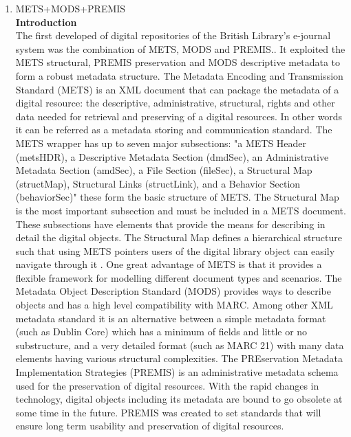 \begin{enumerate}
	\item METS+MODS+PREMIS\\
	{\bf Introduction}\\
	The first developed of digital repositories of the British Library's e-journal system was the combination of METS, MODS and PREMIS..\cite{Dappert2008} 
	It exploited the METS structural, PREMIS preservation and MODS descriptive metadata to form a robust metadata structure. 
	The Metadata Encoding and Transmission Standard (METS) is an XML document that can package the metadata of a digital resource: 
	the descriptive, administrative, structural, rights and other data needed for retrieval and preserving of a digital resources.\cite{Guenther2003} 
	In other words it can be referred as a metadata storing and communication standard. The METS wrapper has up to seven major subsections: 
	"a METS Header (metsHDR), a Descriptive Metadata Section (dmdSec), an Administrative Metadata Section (amdSec), a File Section (fileSec), 
	a Structural Map (structMap), Structural Links (structLink), and a Behavior Section (behaviorSec)" these form the basic structure of METS. 
	The Structural Map is the most important subsection and must be included in a METS document.\cite{Cheslow2014} 
	These subsections have elements that provide the means for describing in detail the digital objects. 
	The Structural Map defines a hierarchical structure such that using METS pointers users of the digital library object can easily navigate through it . 
	One great advantage of METS is that it provides a flexible framework for modelling different document types and scenarios.\cite{Dappert2008}
	The Metadata Object Description Standard (MODS) provides ways to describe objects and has a high level compatibility with MARC. 
	Among other XML metadata standard it is an alternative between a simple metadata format (such as Dublin Core) 
	which has a minimum of fields and little or no substructure, and a very detailed format (such as MARC 21) with many data elements having various structural complexities.\cite{Guenther2003}
	The PREservation Metadata Implementation Strategies (PREMIS) is an administrative metadata schema used for the preservation of digital resources.\cite{Cheslow2014} 
	With the rapid changes in technology, digital objects including its metadata are bound to go obsolete at some time in the future. 
	PREMIS was created to set standards that will ensure long term usability and preservation of digital resources.
	

\end{enumerate}
